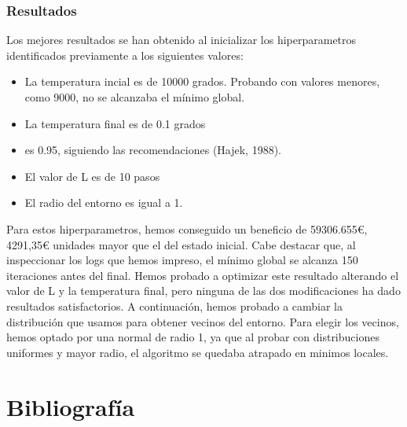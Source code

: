 \documentclass[a4paper,12pt]{article}
\begin{document}
	\subsubsection{Resultados}
	Los mejores resultados se han obtenido al inicializar los hiperparametros identificados previamente a los siguientes valores:
	\begin{itemize}
		\item La temperatura incial es de 10000 grados. Probando con valores menores, como 9000, no se alcanzaba el mínimo global.
		\item La temperatura final es de 0.1 grados
		\item \alpha es 0.95, siguiendo las recomendaciones (Hajek, 1988).
		\item El valor de L es de 10 pasos
		\item El radio del entorno es igual a 1.
	\end{itemize}
	Para estos hiperparametros, hemos conseguido un beneficio de 59306.655€, 4291,35€ unidades mayor que el del estado inicial. Cabe destacar que, 
	al inspeccionar los logs que hemos impreso, el mínimo global se alcanza 150 iteraciones antes del final. Hemos probado a optimizar este
	resultado alterando el valor de L y la temperatura final, pero ninguna de las dos modificaciones ha dado resultados satisfactorios. A continuación,
	hemos probado a cambiar la distribución que usamos para obtener vecinos del entorno. Para elegir los vecinos, hemos optado por una normal de radio 1, ya que 
	al probar con distribuciones uniformes y mayor radio, el algoritmo se quedaba atrapado en minimos locales.
	
\newpage
	\section*{Bibliografía}
	
	
	
\end{document}

